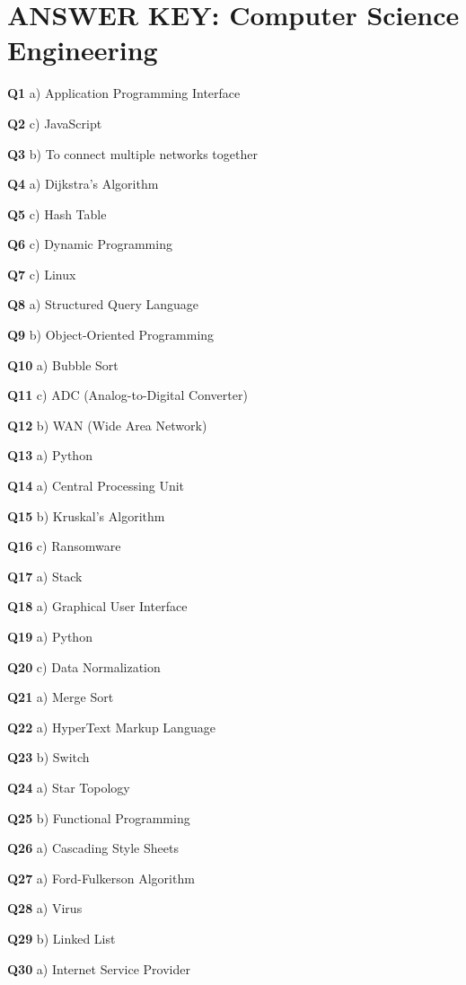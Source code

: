 \section{ANSWER KEY: Computer Science Engineering}

\textbf{Q1} a) Application Programming Interface\par
\textbf{Q2} c) JavaScript\par
\textbf{Q3} b) To connect multiple networks together\par
\textbf{Q4} a) Dijkstra's Algorithm\par
\textbf{Q5} c) Hash Table\par
\textbf{Q6} c) Dynamic Programming\par
\textbf{Q7} c) Linux\par
\textbf{Q8} a) Structured Query Language\par
\textbf{Q9} b) Object-Oriented Programming\par
\textbf{Q10} a) Bubble Sort\par
\textbf{Q11} c) ADC (Analog-to-Digital Converter)\par
\textbf{Q12} b) WAN (Wide Area Network)\par
\textbf{Q13} a) Python\par
\textbf{Q14} a) Central Processing Unit\par
\textbf{Q15} b) Kruskal's Algorithm\par
\textbf{Q16} c) Ransomware\par
\textbf{Q17} a) Stack\par
\textbf{Q18} a) Graphical User Interface\par
\textbf{Q19} a) Python\par
\textbf{Q20} c) Data Normalization\par
\textbf{Q21} a) Merge Sort\par
\textbf{Q22} a) HyperText Markup Language\par
\textbf{Q23} b) Switch\par
\textbf{Q24} a) Star Topology\par
\textbf{Q25} b) Functional Programming\par
\textbf{Q26} a) Cascading Style Sheets\par
\textbf{Q27} a) Ford-Fulkerson Algorithm\par
\textbf{Q28} a) Virus\par
\textbf{Q29} b) Linked List\par
\textbf{Q30} a) Internet Service Provider\par
